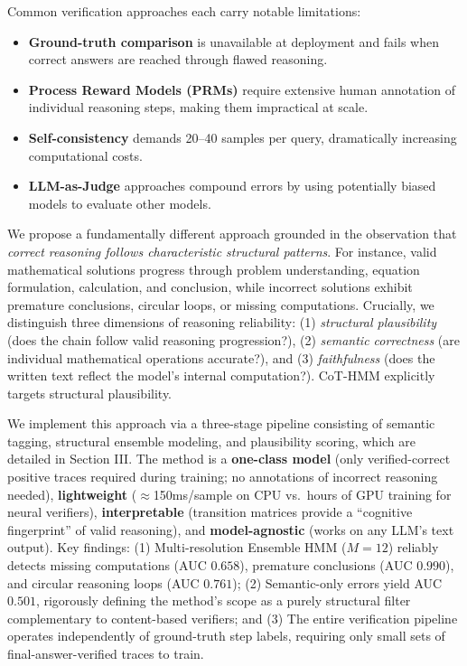 \documentclass[conference]{IEEEtran}
\begin{document}
Common verification approaches each carry notable limitations:
\begin{itemize}
    \item \textbf{Ground-truth comparison} is unavailable at deployment and fails when correct answers are reached through flawed reasoning.
    \item \textbf{Process Reward Models (PRMs)} \cite{lightman2024let} require extensive human annotation of individual reasoning steps, making them impractical at scale.
    \item \textbf{Self-consistency} \cite{wang2023self} demands 20--40 samples per query, dramatically increasing computational costs.
    \item \textbf{LLM-as-Judge} approaches compound errors by using potentially biased models to evaluate other models.
\end{itemize}
We propose a fundamentally different approach grounded in the observation that \textit{correct reasoning follows characteristic structural patterns}. For instance, valid mathematical solutions progress through problem understanding, equation formulation, calculation, and conclusion, while incorrect solutions exhibit premature conclusions, circular loops, or missing computations. Crucially, we distinguish three dimensions of reasoning reliability: (1) \textit{structural plausibility} (does the chain follow valid reasoning progression?), (2) \textit{semantic correctness} (are individual mathematical operations accurate?), and (3) \textit{faithfulness} (does the written text reflect the model's internal computation?). CoT-HMM explicitly targets structural plausibility.

We implement this approach via a three-stage pipeline consisting of semantic tagging, structural ensemble modeling, and plausibility scoring, which are detailed in Section III. The method is a \textbf{one-class model} (only verified-correct positive traces required during training; no annotations of incorrect reasoning needed), \textbf{lightweight} ($\approx$150ms/sample on CPU vs.\ hours of GPU training for neural verifiers), \textbf{interpretable} (transition matrices provide a ``cognitive fingerprint'' of valid reasoning), and \textbf{model-agnostic} (works on any LLM's text output). Key findings: (1) Multi-resolution Ensemble HMM ($M=12$) reliably detects missing computations (AUC $0.658$), premature conclusions (AUC $0.990$), and circular reasoning loops (AUC $0.761$); (2) Semantic-only errors yield AUC $0.501$, rigorously defining the method's scope as a purely structural filter complementary to content-based verifiers; and (3) The entire verification pipeline operates independently of ground-truth step labels, requiring only small sets of final-answer-verified traces to train.
\end{document}
